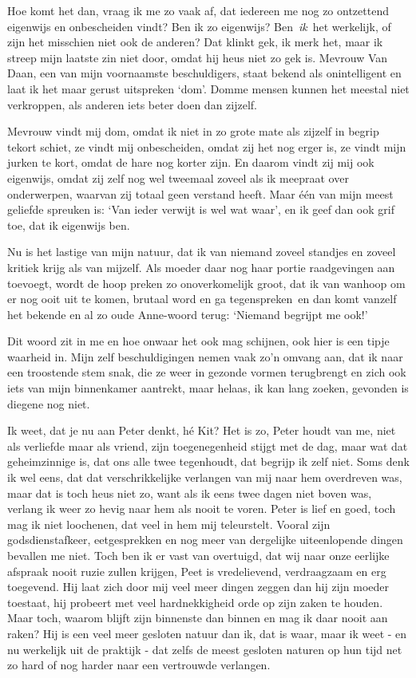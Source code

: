 \documentclass{book}
\begin{document}
Hoe komt het dan, vraag ik me zo vaak af, dat iedereen me nog zo ontzettend
eigenwijs en onbescheiden vindt? Ben ik zo eigenwijs?  Ben~\emph{ik}~het
werkelijk, of zijn het misschien niet ook de anderen?  Dat klinkt gek, ik merk
het, maar ik streep mijn laatste zin niet door, omdat hij heus niet zo gek is.
Mevrouw Van Daan, een van mijn voornaamste beschuldigers, staat bekend als
onintelligent en laat ik het maar gerust uitspreken `dom'. Domme mensen kunnen
het meestal niet verkroppen, als anderen iets beter doen dan zijzelf.

Mevrouw vindt mij dom, omdat ik niet in zo grote mate als zijzelf in begrip
tekort schiet, ze vindt mij onbescheiden, omdat zij het nog erger is, ze vindt
mijn jurken te kort, omdat de hare nog korter zijn. En daarom vindt zij mij ook
eigenwijs, omdat zij zelf nog wel tweemaal zoveel als ik meepraat over
onderwerpen, waarvan zij totaal geen verstand heeft. Maar één van mijn meest
geliefde spreuken is: `Van ieder verwijt is wel wat waar', en ik geef dan ook
grif toe, dat ik eigenwijs ben.

Nu is het lastige van mijn natuur, dat ik van niemand zoveel standjes en zoveel
kritiek krijg als van mijzelf. Als moeder daar nog haar portie raadgevingen aan
toevoegt, wordt de hoop preken zo onoverkomelijk groot, dat ik van wanhoop om er
nog ooit uit te komen, brutaal word en ga tegenspreken~en dan komt vanzelf het
bekende en al zo oude Anne-woord terug: `Niemand begrijpt me ook!'

Dit woord zit in me en hoe onwaar het ook mag schijnen, ook hier is een tipje
waarheid in. Mijn zelf beschuldigingen nemen vaak zo'n omvang aan, dat ik naar
een troostende stem snak, die ze weer in gezonde vormen terugbrengt en zich ook
iets van mijn binnenkamer aantrekt, maar helaas, ik kan lang zoeken, gevonden is
diegene nog niet.

Ik weet, dat je nu aan Peter denkt, hé Kit? Het is zo, Peter houdt van me, niet
als verliefde maar als vriend, zijn toegenegenheid stijgt met de dag, maar wat
dat geheimzinnige is, dat ons alle twee tegenhoudt, dat begrijp ik zelf niet.
Soms denk ik wel eens, dat dat verschrikkelijke verlangen van mij naar hem
overdreven was, maar dat is toch heus niet zo, want als ik eens twee dagen niet
boven was, verlang ik weer zo hevig naar hem als nooit te voren. Peter is lief
en goed, toch mag ik niet loochenen, dat veel in hem mij teleurstelt. Vooral
zijn godsdienstafkeer, eetgesprekken en nog meer van dergelijke uiteenlopende
dingen bevallen me niet. Toch ben ik er vast van overtuigd, dat wij naar onze
eerlijke afspraak nooit ruzie zullen krijgen, Peet is vredelievend, verdraagzaam
en erg toegevend. Hij laat zich door mij veel meer dingen zeggen dan hij zijn
moeder toestaat, hij probeert met veel hardnekkigheid orde op zijn zaken te
houden. Maar toch, waarom blijft zijn binnenste dan binnen en mag ik daar nooit
aan raken? Hij is een veel meer gesloten natuur dan ik, dat is waar, maar ik
weet - en nu werkelijk uit de praktijk - dat zelfs de meest gesloten naturen op
hun tijd net zo hard of nog harder naar een vertrouwde verlangen.
\end{document}
